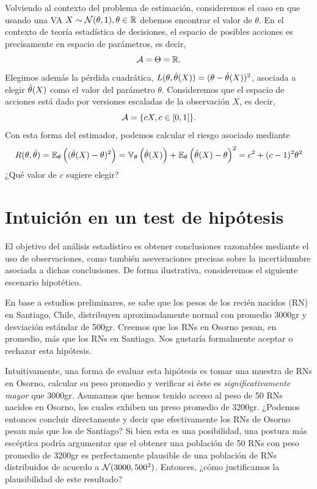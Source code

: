 \begin{example}
	Volviendo al contexto del problema de estimación, consideremos el caso en que usando una VA $X\sim{\mathcal N}(\theta,1), \theta\in{\mathbb R}$ debemos encontrar el valor de $\theta$. En el contexto de teoría estadística de decisiones, el espacio de posibles acciones es precisamente en espacio de parámetros, es decir, 
	\begin{equation}
		{\mathcal A} = \Theta = {\mathbb R}.
	\end{equation}
	Elegimos además la pérdida cuadrática, $L(\theta,{\hat\theta}(X)) = (\theta-{\hat\theta}(X))^2$, asociada a elegir ${\hat\theta}(X)$ como el valor del parámetro $\theta$. Consideremos que el espacio de acciones está dado por versiones escaladas de la observación $X$, es decir, 
	\begin{equation}
		{\mathcal A} = \{cX, c\in[0,1]\}.
	\end{equation}
	Con esta forma del estimador, podemos calcular el riesgo asociado mediante  
	\begin{equation}
		R(\theta,{\hat\theta})= \mathbb{E}_\theta \left(({\hat\theta}(X)-\theta)^2\right) = \mathbb{V}_\theta \left({\hat\theta}(X)\right) + \mathbb{E}_\theta \left({\hat\theta}(X)-\theta\right)^2 = c^2 + (c-1)^2\theta^2
	\end{equation}
	¿Qué valor de $c$ sugiere elegir?
\end{example}


\section{Intuición en un test de hipótesis} 
\label{sec:int_hipótesis}

El objetivo del análisis estadístico es obtener conclusiones razonables mediante el uso de observaciones, como también aseveraciones precisas sobre la incertidumbre asociada a dichas conclusiones. De forma ilustrativa, consideremos el siguiente escenario hipotético.

En base a estudios preliminares, se sabe que los pesos de los recién nacidos (RN) en Santiago, Chile, distribuyen aproximadamente normal con promedio 3000gr y desviación estándar de 500gr. Creemos que los RNs en Osorno pesan, en promedio, más que los RNs en Santiago. Nos gustaría formalmente aceptar o rechazar esta hipótesis. 

Intuitivamente, una forma de evaluar esta hipótesis es tomar una muestra de RNs en Osorno, calcular su peso promedio y verificar si éste es \textit{significativamente mayor} que 3000gr. Asumamos que hemos tenido acceso al peso de 50 RNs nacidos en Osorno, los cuales exhiben un preso promedio de 3200gr. ¿Podemos entonces concluir directamente y decir que efectivamente los RNs de Osorno pesan más que los de Santiago?  Si bien esta es una posibilidad, una postura más escéptica podría argumentar que el obtener una población de 50 RNs con peso promedio de 3200gr es perfectamente plausible de una población de RNs distribuidos de acuerdo a ${\mathcal N}(3000,500^2)$. Entonces, ¿cómo justificamos la plausibilidad de este resultado?

